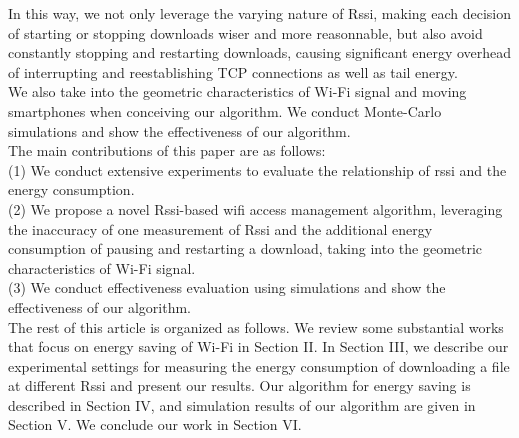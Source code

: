 \documentclass[journal]{IEEEtran}
\begin{document}
In this way, we not only leverage the varying nature of Rssi, making each decision of starting or stopping downloads wiser and more reasonnable, 
but also avoid constantly stopping and restarting downloads, causing 
significant energy overhead of interrupting and reestablishing TCP connections as well as tail energy.
\\
\indent
We also take into the geometric characteristics of Wi-Fi signal and moving smartphones when conceiving our algorithm. We conduct Monte-Carlo
simulations and show the effectiveness of our algorithm.
\\
\indent
The main contributions of this paper are as follows:
\\
\indent
(1) We conduct extensive experiments to evaluate the relationship of rssi and the energy consumption.
\\
\indent
(2) We propose a novel Rssi-based wifi access management algorithm, leveraging 
the inaccuracy of one measurement of Rssi and the additional energy consumption of pausing and restarting a download, taking
into the geometric characteristics of Wi-Fi signal.
\\
\indent
(3) We conduct effectiveness evaluation using simulations and show the effectiveness of our algorithm.
\\
\indent
The rest of this article is organized as follows. We review some substantial works that
focus on energy saving of Wi-Fi in Section II. In Section III,
we describe our experimental settings for measuring the energy consumption of downloading a file at different Rssi and present our results.
Our algorithm for energy saving is described in Section IV, and simulation results of our algorithm are given in Section V.
We conclude our work in Section VI.
\end{document}
